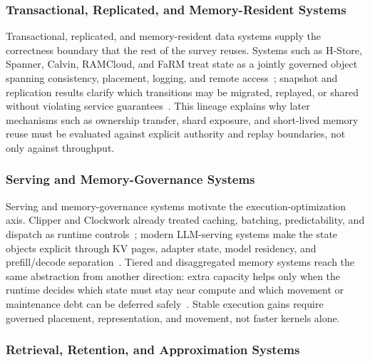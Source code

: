 \documentclass[manuscript,nonacm]{acmart}
\begin{document}
\subsubsection{Transactional, Replicated, and Memory-Resident Systems}

Transactional, replicated, and memory-resident data systems supply the correctness boundary that the rest of the survey reuses. Systems such as H-Store, Spanner, Calvin, RAMCloud, and FaRM treat state as a jointly governed object spanning consistency, placement, logging, and remote access~\cite{kallman2008hstore,corbett2012spanner,thomson2012calvin,ousterhout2011ramcloud,dragojevic2014farm}; snapshot and replication results clarify which transitions may be migrated, replayed, or shared without violating service guarantees~\cite{chandy1985snapshot,ongaro2014raft}. This lineage explains why later mechanisms such as ownership transfer, shard exposure, and short-lived memory reuse must be evaluated against explicit authority and replay boundaries, not only against throughput.

\subsubsection{Serving and Memory-Governance Systems}

Serving and memory-governance systems motivate the execution-optimization axis. Clipper and Clockwork already treated caching, batching, predictability, and dispatch as runtime controls~\cite{crankshaw2017clipper,gujarati2020clockwork}; modern LLM-serving systems make the state objects explicit through KV pages, adapter state, model residency, and prefill/decode separation~\cite{kwon2023pagedattention,sheng2023slora,zheng2023sglang,agrawal2024sarathi,zhong2024distserve,patel2024splitwise,yu2025prism,zhang2025jenga}. Tiered and disaggregated memory systems reach the same abstraction from another direction: extra capacity helps only when the runtime decides which state must stay near compute and which movement or maintenance debt can be deferred safely~\cite{hu2024aceso,zhong2024unimem,jalalian2024extmem,raybuck2021hemem,cho2024coaxial,zhao2025equilibria,peng2024scalacache,wang2025finemem,chang2024gmt,li2024streamcache,qiu2025hotrap}. Stable execution gains require governed placement, representation, and movement, not faster kernels alone.

\subsubsection{Retrieval, Retention, and Approximation Systems}
\end{document}
